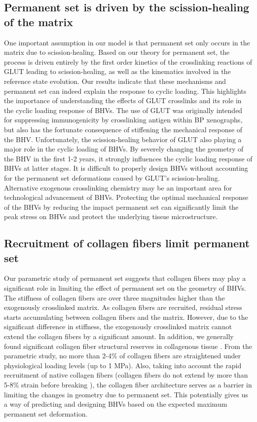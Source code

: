 \subsection{Permanent set is driven by the scission-healing of the matrix}
	One important assumption in our model is that permanent set only occurs in the matrix due to scission-healing. 
	Based on our theory for permanent set, the process is driven entirely by the first order kinetics of the crosslinking reactions of GLUT leading to scission-healing, as well as the kinematics involved in the reference state evolution. 
	Our results indicate that these mechanisms and permanent set can indeed explain the response to cyclic loading.
	This highlights the importance of understanding the effects of GLUT crosslinks and its role in the cyclic loading response of BHVs. 
	The use of GLUT was originally intended for suppressing immunogenicity by crosslinking antigen within BP xenographs, but also has the fortunate consequence of stiffening the mechanical response of the BHV. 
	Unfortunately, the scission-healing behavior of GLUT also playing a major role in the cyclic loading of BHVs. 
	By severely changing the geometry of the BHV in the first 1-2 years, it strongly influences the cyclic loading response of BHVs at latter stages. 
	It is difficult to properly design BHVs without accounting for the permanent set deformations caused by GLUT's scission-healing. 
	Alternative exogenous crosslinking chemistry \cite{tam_fixation_2017, tam_novel_2015} may be an important area for technological advancement of BHVs. 
	Protecting the optimal mechanical response of the BHVs by reducing the impact permanent set can significantly limit the peak stress on BHVs and protect the underlying tissue microstructure. 

\subsection{Recruitment of collagen fibers limit permanent set}
	Our parametric study of permanent set suggests that collagen fibers may play a significant role in limiting the effect of permanent set on the geometry of BHVs. 
	The stiffness of collagen fibers are over three magnitudes higher than the exogenously crosslinked matrix. 
	As collagen fibers are recruited, residual stress starts accumulating between collagen fibers and the matrix. 
	However, due to the significant difference in stiffness, the exogenously crosslinked matrix cannot extend the collagen fibers by a significant amount. 
	In addition, we generally found significant collagen fiber structural reserves in collagenous tissue \cite{zhang_meso_2016}. From the parametric study, no more than 2-4\% of collagen fibers are straightened under physiological loading levels (up to 1 MPa). 
	Also, taking into account the rapid recruitment of native collagen fibers (collagen fibers do not extend by more than 5-8\% strain before breaking \cite{buehler_atomistic_2006}), the collagen fiber architecture serves as a barrier in limiting the changes in geometry due to permanent set. 
	This potentially gives us a way of predicting and designing BHVs based on the expected maximum permanent set deformation. 